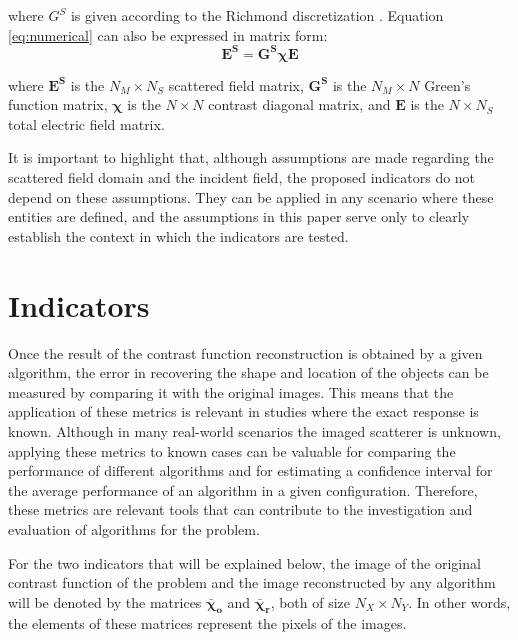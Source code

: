 \documentclass{IEEEtran}
\newcommand{\Es}{\mathbf{E^S}}
\newcommand{\GS}{\mathbf{G^S}}
\newcommand{\X}{\boldsymbol{\chi}}
\newcommand{\E}{\mathbf{E}}
\newcommand{\Xo}{\boldsymbol{\bar{\chi}_o}}
\newcommand{\Xr}{\boldsymbol{\bar{\chi}_r}}
\begin{document}
		\noindent where $G^S$ is given according to the Richmond discretization \cite{richmond1965scattering, pastorino2010ch3}. Equation \eqref{eq:numerical} can also be expressed in matrix form:
		\begin{equation}
			\Es = \GS\X\E
		\end{equation}
		
		\noindent where $\Es$ is the $N_M \times N_S$ scattered field matrix, $\GS$ is the $N_M \times N$ Green's function matrix, $\X$ is the $N \times N$ contrast diagonal matrix, and $\E$ is the $N \times N_S$ total electric field matrix.
		
		It is important to highlight that, although assumptions are made regarding the scattered field domain and the incident field, the proposed indicators do not depend on these assumptions. They can be applied in any scenario where these entities are defined, and the assumptions in this paper serve only to clearly establish the context in which the indicators are tested.
	
	\section{Indicators}\label{sec:indicators}

		
		Once the result of the contrast function reconstruction is obtained by a given algorithm, the error in recovering the shape and location of the objects can be measured by comparing it with the original images. This means that the application of these metrics is relevant in studies where the exact response is known. Although in many real-world scenarios the imaged scatterer is unknown, applying these metrics to known cases can be valuable for comparing the performance of different algorithms and for estimating a confidence interval for the average performance of an algorithm in a given configuration. Therefore, these metrics are relevant tools that can contribute to the investigation and evaluation of algorithms for the problem.
		
		For the two indicators that will be explained below, the image of the original contrast function of the problem and the image reconstructed by any algorithm will be denoted by the matrices $\Xo$ and $\Xr$, both of size $N_X \times N_Y$. In other words, the elements of these matrices represent the pixels of the images.

	
\end{document}
